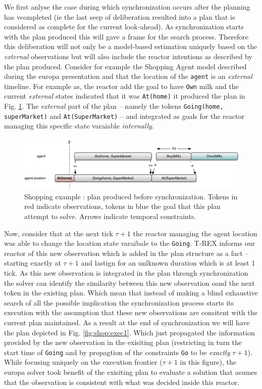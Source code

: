 We first anlyse the case during which synchronization occurs after the
planning has vcompleted (ie the last seep of deliberation resulted into
a plan that is considered as complete for the current look-ahead). As
synchronization starts with  the plan produced this will gave a frame
for the search process. Therefore this deliberation will not only be a
model-based estimation uniquely based on the {\em external}
observations but will also include the reactor intentions as described
by the plan produced. Consider for example the Shopping Agent model
described during the europa presentation and that the
location of the \texttt{agent} is an {\em external} timeline. For
example as, the reactor add the goal to have \texttt{Own} milk and the
current {\em external} states indicated that it was \texttt{At(home)} it
produced the plan in Fig. \ref{fig:shop:exec0}. The  {\em external}
  part of the plan -- namely the tokens \texttt{Going(home,
    superMarket)} and \texttt{At(SuperMarket)} -- and integrated as
  goals for the reactor managing this specific state varaiable {\em
    internally}. 

\begin{figure}[!htb]
  \centering
  \includegraphics[width=0.7\columnwidth]{figs/shoping_exec_t0}
  \caption{Shopping example : plan produced before synchronization. 
    Tokens in red indicate observations, 
    tokens in blue the goal that this plan attempt to solve. Arrows
    indicate temporal constraints.}
  \label{fig:shop:exec0}
\end{figure}

Now, consider that at the next tick $\tau+1$ the reactor managing the
agent location was able to change the location state varaibale to 
the \texttt{Going}. T-REX informs our reactor of this new observation
which is added in the plan structure as a fact -- starting exactly at
$\tau+1$ and lastign for an unlknown duration which is at least 1
tick. As this new observation is integrated in the plan through
synchronization the solver can identify the similarity between this
new observation oand the next token in the existing plan. Which mean
that instead of making a blind exhaustive search of all the possible
implication the synchronization process starts its execution with the
assumption that these new observations are consitent with the current
plan maintained. As a result at the end of synchronization we will
have the plan depicted in Fig. \ref{fig:shop:exec1}. Which just
propagated the information provided by the new observation  in the
exisiting plan (restricting in turn the start time of 
\texttt{Going} and by propagtion of the constraints \texttt{Go} to  be
{\em exactly} $\tau+1$). While focusing uniquely on the execution
frontier ($\tau+1$ in this figure), the europa solver took benefit of
the exisiting plan to evaluate a solution that asumes that the
observation is consistent with what was decided  inside this
reactor. 


